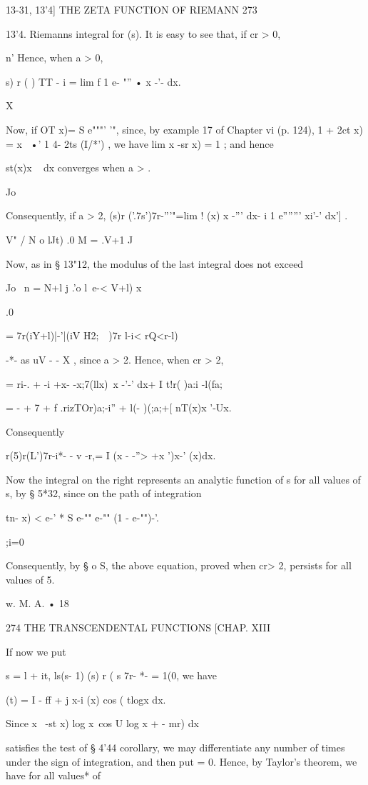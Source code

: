 13-31, 13'4] THE ZETA FUNCTION OF RIEMANN 273

13'4. Riemanns integral for (s). It is easy to see that, if cr > 0,

n' Hence, when a > 0,

   s) r ( ) TT - i = lim f 1 e- "'' • x -'- dx.

X

Now, if OT x)= S e"""' '", since, by example 17 of Chapter vi (p.
124), 1 + 2ct x) = x~ •' 1 4- 2ts (I/*') , we have lim x -sr x) = 1 ;
and hence

 st(x)x ~ dx converges when a > .

Jo

Consequently, if a > 2, (s)r ('.7s')7r-'''"=lim ! (x) x -''' dx- i 1
e''''''' xi'-' dx'] .

V" / N o lJt) .0 M = .V+1 J

Now, as in § 13"12, the modulus of the last integral does not exceed

Jo \ n = N+l j .'o l\ e-< V+l) x

.0

= 7r(iY+l)|-'|(iV H2;\ \ )7r l-i< rQ<r-l)

-*- as uV - - X , since a > 2. Hence, when cr > 2,

= ri-. + -i +x- -x;7(llx)\ x -'-' dx+ I t!r( )a:i -l(fa;

= - + 7 + f .rizTOr)a;-i'' + l(- )(;a;+[ nT(x)x '-Ux.

Consequently

r(5)r(L')7r-i*- - v -r,= I (x - -''> +x ')x-' (x)dx.

Now the integral on the right represents an analytic function of s for
all values of s, by § 5*32, since on the path of integration

tn- x) < e-' * S e-"" e-"" (1 - e-"")-'.

;i=0

Consequently, by § o S, the above equation, proved when cr> 2,
persists for all values of 5.

w. M. A. • 18

274 THE TRANSCENDENTAL FUNCTIONS [CHAP. XIII

If now we put

s = l + it, ls(s- 1) (s) r ( s 7r- *- = 1(0, we have

  (t) = I - ff + j x-i (x) cos ( tlogx dx.

Since x~ -st x) log x\ cos U log x + - mr) dx

satisfies the test of § 4'44 corollary, we may differentiate any
number of times under the sign of integration, and then put = 0.
Hence, by Taylor's theorem, we have for all values* of

